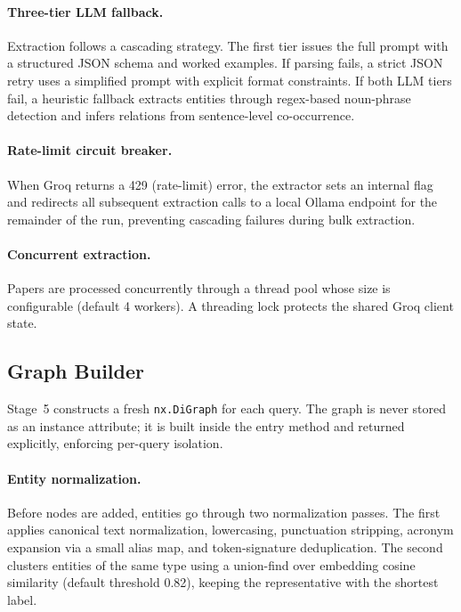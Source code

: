 \documentclass[11pt,a4paper]{article}
\begin{document}
\paragraph{Three-tier LLM fallback.}
Extraction follows a cascading strategy. The first tier issues the full
prompt with a structured JSON schema and worked examples. If parsing fails,
a strict JSON retry uses a simplified prompt with explicit format constraints.
If both LLM tiers fail, a heuristic fallback extracts entities through
regex-based noun-phrase detection and infers relations from sentence-level
co-occurrence.

\paragraph{Rate-limit circuit breaker.}
When Groq returns a 429 (rate-limit) error, the extractor sets an internal
flag and redirects all subsequent extraction calls to a local Ollama endpoint
for the remainder of the run, preventing cascading failures during bulk
extraction.

\paragraph{Concurrent extraction.}
Papers are processed concurrently through a thread pool whose size is
configurable (default 4 workers). A threading lock protects the shared Groq
client state.

\subsection{Graph Builder}

Stage~5 constructs a fresh \texttt{nx.DiGraph} for each query. The graph is
never stored as an instance attribute; it is built inside the entry method
and returned explicitly, enforcing per-query isolation.

\paragraph{Entity normalization.}
Before nodes are added, entities go through two normalization passes. The
first applies canonical text normalization, lowercasing, punctuation
stripping, acronym expansion via a small alias map, and token-signature
deduplication. The second clusters entities of the same type using a
union-find over embedding cosine similarity (default threshold 0.82),
keeping the representative with the shortest label.
\end{document}
